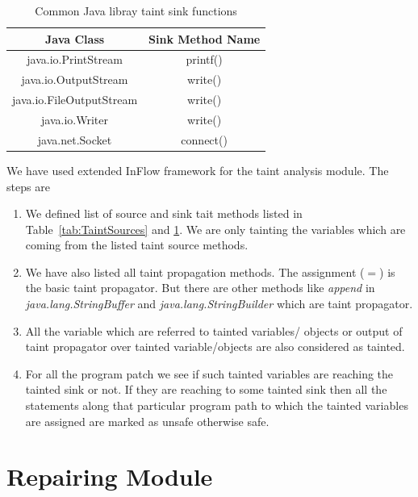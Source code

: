 \begin{table}[!htb]
\centering
\caption{Common Java libray taint sink functions}
\label{tab:TaintSinks}
\begin{tabular}{|c|c|}
\hline

 \textbf{Java Class} & \textbf{Sink Method Name}\\
 \hline java.io.PrintStream & printf()\\ \hline
 java.io.OutputStream & write()\\ \hline
 java.io.FileOutputStream & write()\\ \hline
 java.io.Writer & write()\\ \hline
 java.net.Socket & connect()\\ \hline

\end{tabular}
\end{table}

We have used extended InFlow framework for the taint analysis module. The steps
are

\begin{enumerate}
  \item We defined list of source and sink tait methods listed in
  Table~\ref{tab:TaintSources} and \ref{tab:TaintSinks}. We are only tainting
  the variables which are coming from the listed taint source methods.
  \item We have also listed all taint propagation methods. The assignment ($=$)
  is the basic taint propagator. But there are other methods like \emph{append}
  in \emph{java.lang.StringBuffer} and \emph{java.lang.StringBuilder} which are
  taint propagator.
  \item All the variable which are referred to tainted variables/ objects or
  output of taint propagator over tainted variable/objects are also considered
  as tainted.
  \item For all the program patch we see if such tainted variables are reaching
  the tainted sink or not. If they are reaching to some tainted sink then all
  the statements along that particular program path to which the tainted
  variables are assigned are marked as unsafe otherwise safe.
\end{enumerate}


\section{Repairing Module}
\label{subsec:RepairingModule}

